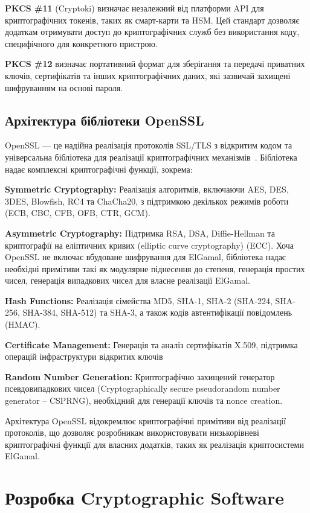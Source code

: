 \textbf{PKCS \#11} (Cryptoki) визначає незалежний від платформи API для криптографічних токенів, таких як смарт-карти 
та HSM. Цей стандарт дозволяє додаткам отримувати доступ до криптографічних служб без використання коду, специфічного 
для конкретного пристрою.

\textbf{PKCS \#12} визначає портативний формат для зберігання та передачі приватних ключів, сертифікатів та інших 
криптографічних даних, які зазвичай захищені шифруванням на основі пароля.

\subsection{Архітектура бібліотеки OpenSSL}

OpenSSL — це надійна реалізація протоколів SSL/TLS з відкритим кодом та універсальна бібліотека для реалізації криптографічних 
механізмів~\cite{openssl}. Бібліотека надає комплексні криптографічні функції, зокрема:

\textbf{Symmetric Cryptography:} Реалізація алгоритмів, включаючи AES, DES, 3DES, Blowfish, RC4 та ChaCha20, з 
підтримкою декількох режимів роботи (ECB, CBC, CFB, OFB, CTR, GCM).

\textbf{Asymmetric Cryptography:} Підтримка RSA, DSA, Diffie-Hellman та криптографії на еліптичних кривих (elliptic curve cryptography) 
(ECC). Хоча OpenSSL не включає вбудоване шифрування для ElGamal, бібліотека надає необхідні примітиви такі як модулярне 
піднесення до степеня, генерація простих чисел, генерація випадкових чисел для власне реалізації ElGamal.

\textbf{Hash Functions:} Реалізація сімейства MD5, SHA-1, SHA-2 (SHA-224, SHA-256, SHA-384, SHA-512) та SHA-3, а також 
кодів автентифікації повідомлень (HMAC).

\textbf{Certificate Management:} Генерація та аналіз сертифікатів X.509, підтримка операцій інфраструктури відкритих ключів

\textbf{Random Number Generation:} Криптографічно захищений генератор псевдовипадкових чисел (Cryptographically 
secure pseudorandom number generator -- CSPRNG), необхідний для генерації ключів та nonce creation.

Архітектура OpenSSL відокремлює криптографічні примітиви від реалізації протоколів, що дозволяє розробникам використовувати 
низькорівневі криптографічні функції для власних додатків, таких як реалізація криптосистеми ElGamal.

\section{Розробка Cryptographic Software}


